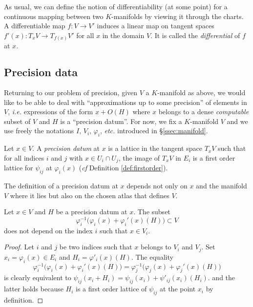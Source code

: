 \documentclass{lms}
\begin{document}
As usual, we can define the notion of differentiability (at some 
point) for a continuous mapping between two $K$-manifolds by viewing it 
through the charts. A  differentiable map $f : V \to V'$ induces 
a linear map on tangent spaces $f'(x) : T_x V \to T_{f(x)} V'$ for all 
$x$ in the domain $V$. It is called the \emph{differential} of $f$ at
$x$.

\subsection{Precision data}

Returning to our problem of precision, given $V$ a $K$-manifold as 
above, we would like to be able to deal with ``approximations up to some 
precision'' of elements in $V$, \emph{i.e.} expressions of the form $x + 
O(H)$ where $x$ belongs to a dense \emph{computable} subset of $V$ and 
$H$ is a ``precision datum''.
For now, we fix a $K$-manifold $V$ and we use freely the notations $I$, 
$V_i$, $\varphi_i$, \emph{etc.} introduced in \S \ref{ssec:manifold}.

\begin{deftn}
Let $x \in V$.
A \emph{precision datum} at $x$ is a lattice in the tangent space 
$T_x V$ such that for all indices $i$ and $j$ with $x \in U_i \cap
U_j$, the image of $T_x V$ in $E_i$ is a first order lattice for
$\psi_{ij}$ at $\varphi_i(x)$ (\emph{cf} Definition \ref{def:firstorder}).
\end{deftn}

\begin{rmk}
The definition of a precision datum at $x$ depends not only on $x$
and the manifold $V$ where it lies but also on the chosen atlas that
defines $V$.
\end{rmk}

\begin{lem}
\label{lem:independence}
Let $x \in V$ and $H$ be a precision datum at $x$.
The subset
$$\varphi_i^{-1}\big(\varphi_i(x) + \varphi_i'(x)(H)\big) 
\subset V$$
does not depend on the index $i$ such that $x \in V_i$.
\end{lem}

\begin{proof}
Let $i$ and $j$ be two indices such that $x$ belongs to $V_i$ and $V_j$. 
Set $x_i = \varphi_i(x) \in E_i$ and $H_i = \varphi'_i(x)(H)$. The 
equality 
\[
\varphi_i^{-1}\big(\varphi_i(x) + \varphi_i'(x)(H)\big) 
 = \varphi_j^{-1}\big(\varphi_j(x) + \varphi_j'(x)(H)\big)
 \]
is clearly equivalent to
$\psi_{ij}(x_i + H_i) = \psi_{ij}(x_i) + \psi'_{ij}(x_i)(H_i)$.
and the latter holds because $H_i$ is a first order lattice
of $\psi_{ij}$ at the point $x_i$ by definition.
\end{proof}
\end{document}
